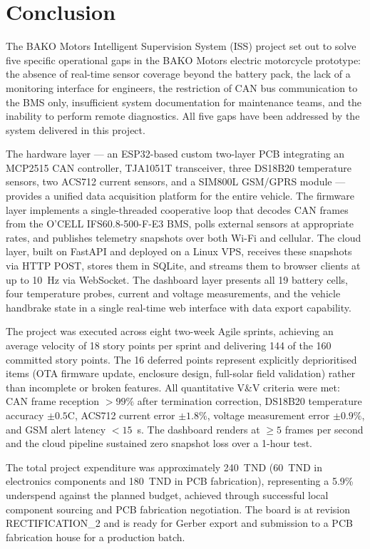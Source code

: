 \section{Conclusion}

The BAKO Motors Intelligent Supervision System (ISS) project set out to solve five specific operational gaps in the BAKO Motors electric motorcycle prototype: the absence of real-time sensor coverage beyond the battery pack, the lack of a monitoring interface for engineers, the restriction of CAN bus communication to the BMS only, insufficient system documentation for maintenance teams, and the inability to perform remote diagnostics. All five gaps have been addressed by the system delivered in this project.

The hardware layer — an ESP32-based custom two-layer PCB integrating an MCP2515 CAN controller, TJA1051T transceiver, three DS18B20 temperature sensors, two ACS712 current sensors, and a SIM800L GSM/GPRS module — provides a unified data acquisition platform for the entire vehicle. The firmware layer implements a single-threaded cooperative loop that decodes CAN frames from the O'CELL IFS60.8-500-F-E3 BMS, polls external sensors at appropriate rates, and publishes telemetry snapshots over both Wi-Fi and cellular. The cloud layer, built on FastAPI and deployed on a Linux VPS, receives these snapshots via HTTP POST, stores them in SQLite, and streams them to browser clients at up to 10~Hz via WebSocket. The dashboard layer presents all 19 battery cells, four temperature probes, current and voltage measurements, and the vehicle handbrake state in a single real-time web interface with data export capability.

The project was executed across eight two-week Agile sprints, achieving an average velocity of 18 story points per sprint and delivering 144 of the 160 committed story points. The 16 deferred points represent explicitly deprioritised items (OTA firmware update, enclosure design, full-solar field validation) rather than incomplete or broken features. All quantitative V\&V criteria were met: CAN frame reception $> 99\%$ after termination correction, DS18B20 temperature accuracy $\pm 0.5$\textdegree{}C, ACS712 current error $\pm 1.8\%$, voltage measurement error $\pm 0.9\%$, and GSM alert latency $< 15$~s. The dashboard renders at $\geq 5$ frames per second and the cloud pipeline sustained zero snapshot loss over a 1-hour test.

The total project expenditure was approximately 240~TND (60~TND in electronics components and 180~TND in PCB fabrication), representing a 5.9\% underspend against the planned budget, achieved through successful local component sourcing and PCB fabrication negotiation. The board is at revision RECTIFICATION\_2 and is ready for Gerber export and submission to a PCB fabrication house for a production batch.

